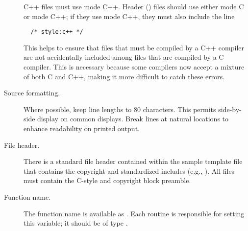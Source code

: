 \documentclass{article}
\begin{document}
\begin{description}
C++ files must use mode C++.  Header () files should use
either mode C or mode C++; if they use mode C++, they must also
include the line
\begin{verbatim}
  /* style:c++ */
\end{verbatim}
This helps to ensure that files that must be compiled by a C++
compiler are not accidentally included among files that are compiled
by a C compiler.  This is necessary because some compilers now accept
a mixture of both C and C++, making it more difficult to catch these
errors.




\item[Source formatting.] 
Where possible, keep line lengths to 80 characters.  This permits
side-by-side display on common displays.  Break lines at natural
locations to enhance readability on printed output.

\item[File header.]
There is a standard file header contained within the sample template
file  that contains the copyright and
standardized includes (e.g., ).  All files must
contain the C-style and copyright block preamble.

\item[Function name.]
The function name is available as .  Each routine is responsible
for setting this variable; it should be of type .



\end{description}
\end{document}
